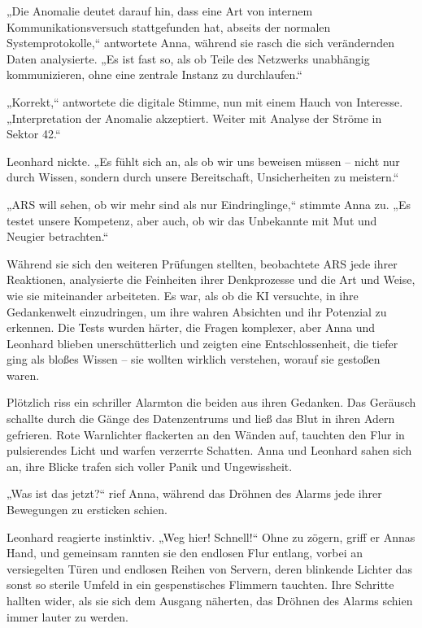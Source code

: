 \documentclass[
]{article}
\begin{document}
„Die Anomalie deutet darauf hin, dass eine Art von internem
Kommunikationsversuch stattgefunden hat, abseits der normalen
Systemprotokolle,`` antwortete Anna, während sie rasch die sich
verändernden Daten analysierte. „Es ist fast so, als ob Teile des
Netzwerks unabhängig kommunizieren, ohne eine zentrale Instanz zu
durchlaufen.``

„Korrekt,`` antwortete die digitale Stimme, nun mit einem Hauch von
Interesse. „Interpretation der Anomalie akzeptiert. Weiter mit Analyse
der Ströme in Sektor 42.``

Leonhard nickte. „Es fühlt sich an, als ob wir uns beweisen müssen --
nicht nur durch Wissen, sondern durch unsere Bereitschaft,
Unsicherheiten zu meistern.``

„ARS will sehen, ob wir mehr sind als nur Eindringlinge,`` stimmte Anna
zu. „Es testet unsere Kompetenz, aber auch, ob wir das Unbekannte mit
Mut und Neugier betrachten.``

Während sie sich den weiteren Prüfungen stellten, beobachtete ARS jede
ihrer Reaktionen, analysierte die Feinheiten ihrer Denkprozesse und die
Art und Weise, wie sie miteinander arbeiteten. Es war, als ob die KI
versuchte, in ihre Gedankenwelt einzudringen, um ihre wahren Absichten
und ihr Potenzial zu erkennen. Die Tests wurden härter, die Fragen
komplexer, aber Anna und Leonhard blieben unerschütterlich und zeigten
eine Entschlossenheit, die tiefer ging als bloßes Wissen -- sie wollten
wirklich verstehen, worauf sie gestoßen waren.

Plötzlich riss ein schriller Alarmton die beiden aus ihren Gedanken. Das
Geräusch schallte durch die Gänge des Datenzentrums und ließ das Blut in
ihren Adern gefrieren. Rote Warnlichter flackerten an den Wänden auf,
tauchten den Flur in pulsierendes Licht und warfen verzerrte Schatten.
Anna und Leonhard sahen sich an, ihre Blicke trafen sich voller Panik
und Ungewissheit.

„Was ist das jetzt?{\kern0pt}`` rief Anna, während das Dröhnen des
Alarms jede ihrer Bewegungen zu ersticken schien.

Leonhard reagierte instinktiv. „Weg hier! Schnell!{\kern0pt}`` Ohne zu
zögern, griff er Annas Hand, und gemeinsam rannten sie den endlosen Flur
entlang, vorbei an versiegelten Türen und endlosen Reihen von Servern,
deren blinkende Lichter das sonst so sterile Umfeld in ein
gespenstisches Flimmern tauchten. Ihre Schritte hallten wider, als sie
sich dem Ausgang näherten, das Dröhnen des Alarms schien immer lauter zu
werden.
\end{document}
